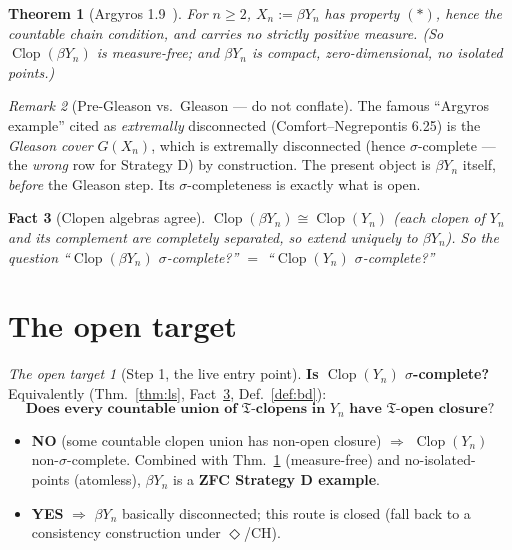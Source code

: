\documentclass[11pt]{article}
\newtheorem{theorem}{Theorem}[section]
\newtheorem{fact}[theorem]{Fact}
\theoremstyle{definition}
\theoremstyle{remark}
\newtheorem{remark}[theorem]{Remark}
\newtheorem*{target}{The open target}
\newcommand{\Clop}{\operatorname{Clop}}
\newcommand{\Y}{Y_n}
\newcommand{\T}{\mathfrak{T}}
\begin{document}
\begin{theorem}[Argyros 1.9~\cite{Argyros1983}]\label{thm:argyros}
For $n\ge2$, $X_n:=\beta\Y$ has property $(\ast)$, hence the countable chain
condition, and carries \emph{no} strictly positive measure. (So $\Clop(\beta\Y)$ is
measure-free; and $\beta\Y$ is compact, zero-dimensional, no isolated points.)
\end{theorem}

\begin{remark}[Pre-Gleason vs.\ Gleason --- do not conflate]\label{rem:gleason}
The famous ``Argyros example'' cited as \emph{extremally} disconnected
(Comfort--Negrepontis 6.25) is the \emph{Gleason cover} $G(X_n)$, which is
extremally disconnected (hence $\sigma$-complete --- the \emph{wrong} row for
Strategy D) by construction. The present object is $\beta\Y$ itself, \emph{before}
the Gleason step. Its $\sigma$-completeness is exactly what is open.
\end{remark}

\begin{fact}[Clopen algebras agree]\label{fact:clop}
$\Clop(\beta\Y)\cong\Clop(\Y)$ (each clopen of $\Y$ and its complement are
completely separated, so extend uniquely to $\beta\Y$). So the question
``$\Clop(\beta\Y)$ $\sigma$-complete?'' $=$ ``$\Clop(\Y)$ $\sigma$-complete?''
\end{fact}

\section{The open target}\label{sec:target}

\begin{mdframed}[backgroundcolor=black!5,linewidth=0.8pt]
\begin{target}[Step 1, the live entry point]
\textbf{Is $\Clop(\Y)$ $\sigma$-complete?} Equivalently (Thm.~\ref{thm:ls},
Fact~\ref{fact:clop}, Def.~\ref{def:bd}):
\[
  \textbf{Does every countable union of }\T\textbf{-clopens in }\Y
  \textbf{ have }\T\textbf{-open closure?}
\]
\begin{itemize}[nosep]
  \item \textbf{NO} (some countable clopen union has non-open closure) $\Rightarrow$
    $\Clop(\Y)$ non-$\sigma$-complete. Combined with Thm.~\ref{thm:argyros}
    (measure-free) and no-isolated-points (atomless), $\beta\Y$ is a
    \textbf{ZFC Strategy D example}.
  \item \textbf{YES} $\Rightarrow$ $\beta\Y$ basically disconnected; this route is
    closed (fall back to a consistency construction under $\Diamond$/CH).
\end{itemize}
\end{target}
\end{mdframed}
\end{document}
